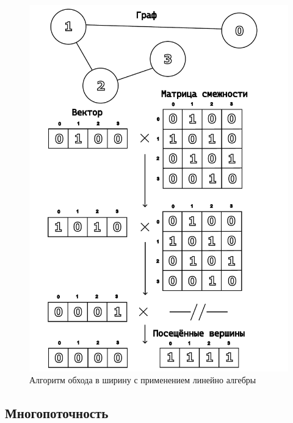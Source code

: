 \begin{figure}[H]
    \centering
    \includegraphics[width=\textwidth]{figures/linear_bfs.pdf}
    \caption{Алгоритм обхода в ширину с применением линейно алгебры}
    \label{fig:linearbfs}
\end{figure}

\subsection{Многопоточность}

